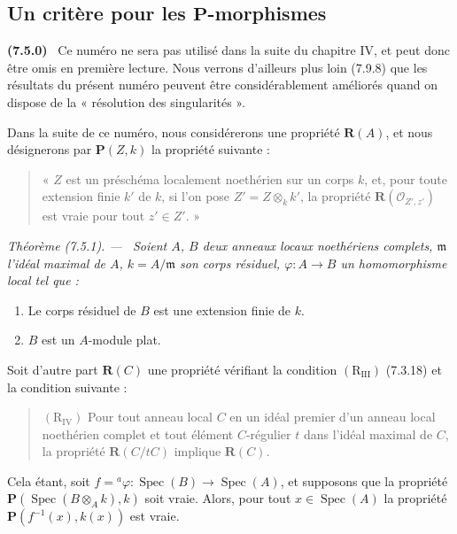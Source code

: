 \documentclass[10pt,oneside]{book}
\newcommand{\oldpage}[2][]{%
  \setcounter{footnote}{0}%
  \marginpar{\scriptsize\textbf{#1}~|~#2}\ignorespaces}
\newenvironment{env}[1][]{\par\medskip\noindent\textbf{(#1)}\ }{\par}
\newenvironment{theorem}[1][]{%
  \par\medskip\noindent\itshape Théorème (#1). ---\ }{\par}
\begin{document}
\subsection{\texorpdfstring{Un critère pour les $\boldsymbol P$-morphismes}{Un critère pour les P-morphismes}}
\label{subsection:IV.7.5-fr}

\begin{env}[7.5.0]
\label{IV.2.s7.5.0-fr}
Ce numéro ne sera pas utilisé dans la suite du chapitre IV, et peut donc être
omis en première lecture. Nous verrons d'ailleurs plus loin (7.9.8) que les
résultats du présent numéro peuvent être considérablement améliorés quand on
dispose de la « résolution des singularités ».

Dans la suite de ce numéro, nous considérerons une propriété
$\boldsymbol R(A)$, et nous désignerons par $\boldsymbol P(Z,k)$ la propriété
suivante :
\begin{quote}
« $Z$ est un préschéma localement noethérien sur un corps $k$, et, pour toute
extension finie $k'$ de $k$, si l'on pose $Z'=Z\otimes_k k'$, la propriété
$\boldsymbol R(\mathscr O_{Z',z'})$ est vraie pour tout $z'\in Z'$. »
\end{quote}
\end{env}

\begin{theorem}[7.5.1]
\label{IV.2.s7.5.1-fr}
Soient $A$, $B$ deux anneaux locaux noethériens complets, $\mathfrak m$
l'idéal maximal de $A$, $k=A/\mathfrak m$ son corps résiduel,
$\varphi:A\to B$ un homomorphisme local tel que :
\begin{enumerate}
\item[\emph{(i)}] Le corps résiduel de $B$ est une extension finie de $k$.
\item[\emph{(ii)}] $B$ est un $A$-module plat.
\end{enumerate}
Soit d'autre part $\boldsymbol R(C)$ une propriété vérifiant la condition
$(\mathrm R_{\mathrm{III}})$ (7.3.18) et la condition suivante :
\begin{quote}
$(\mathrm R_{\mathrm{IV}})$ Pour tout anneau local $C$ en un idéal premier
d'un anneau local noethérien complet et tout élément $C$-régulier $t$ dans
l'idéal maximal de $C$, la propriété $\boldsymbol R(C/tC)$ implique
$\boldsymbol R(C)$.
\end{quote}

\oldpage[IV-2]{204}

Cela étant, soit $f={}^a\varphi:\operatorname{Spec}(B)\to
\operatorname{Spec}(A)$, et supposons que la propriété
$\boldsymbol P(\operatorname{Spec}(B\otimes_A k),k)$ soit vraie. Alors, pour
tout $x\in\operatorname{Spec}(A)$ la propriété
$\boldsymbol P(f^{-1}(x),k(x))$ est vraie.
\end{theorem}
\end{document}
